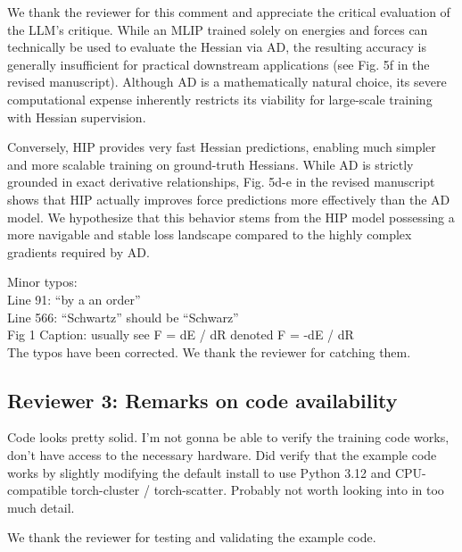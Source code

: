 \documentclass[pdflatex,sn-mathphys-num]{sn-jnl}
\begin{document}
{\color{mycustomcolour}
\noindent We thank the reviewer for this comment and appreciate the critical evaluation of the LLM's critique. While an MLIP trained solely on energies and forces can technically be used to evaluate the Hessian via AD, the resulting accuracy is generally insufficient for practical downstream applications (see Fig. 5f in the revised manuscript). Although AD is a mathematically natural choice, its severe computational expense inherently restricts its viability for large-scale training with Hessian supervision.

Conversely, HIP provides very fast Hessian predictions, enabling much simpler and more scalable training on ground-truth Hessians. While AD is strictly grounded in exact derivative relationships, Fig. 5d-e in the revised manuscript shows that HIP actually improves force predictions more effectively than the AD model. We hypothesize that this behavior stems from the HIP model possessing a more navigable and stable loss landscape compared to the highly complex gradients required by AD.
}
\vspace{2mm}

\noindent Minor typos:\\
Line 91: “by a an order”\\
Line 566: “Schwartz” should be “Schwarz”\\
Fig 1 Caption: usually see F = dE / dR denoted F = -dE / dR\\

{\color{mycustomcolour}
\noindent The typos have been corrected. We thank the reviewer for catching them.
}
\vspace{2mm}

\subsection*{Reviewer 3: Remarks on code availability}

Code looks pretty solid. I'm not gonna be able to verify the training code works, don't have access to the necessary hardware. Did verify that the example code works by slightly modifying the default install to use Python 3.12 and CPU-compatible torch-cluster / torch-scatter. Probably not worth looking into in too much detail.

{\color{mycustomcolour}
\noindent We thank the reviewer for testing and validating the example code.
}
\end{document}
